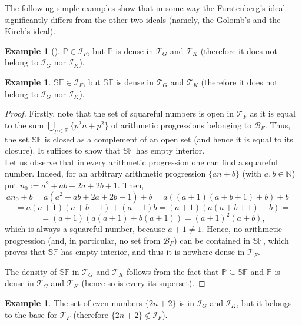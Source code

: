 \documentclass{amsart}
\theoremstyle{definition}
\theoremstyle{definition}
\newtheorem{ex}[thm]{Example}
\newcommand{\N}{{\mathbb N}}
\newcommand{\I}{\mathcal I}
\newcommand{\T}{\mathcal{T}}
\newcommand{\B}{\mathcal{B}}
\newcommand{\SqrFr}{\mathbb{SF}}
\begin{document}
The following simple examples show that in some way the Furstenberg's ideal significantly differs from the other two ideals (namely, the Golomb's and the Kirch's ideal).

\begin{ex}[{\cite[Section 5]{Szczuka4}}] \label{primes}
$\mathbb{P}\in \I_F$, but $\mathbb{P}$ is dense in $\T_G$ and $\T_K$ (therefore it does not belong to $\I_G$ nor $\I_K$).
\end{ex}

\begin{ex} 
$\SqrFr\in \I_F$, but $\SqrFr$ is dense in $\T_G$ and $\T_K$ (therefore it does not belong to $\I_G$ nor $\I_K$).
\end{ex}

\begin{proof}
Firstly, note that the set of squareful numbers is open in $\T_F$ as it is equal to the sum $\bigcup_{p\in\mathbb{P}}{\{p^2 n+p^2\}}$ of arithmetic progressions belonging to $\B_F$. Thus, the set $\SqrFr$ is closed as a complement of an open set (and hence it is equal to its closure). It suffices to show that $\SqrFr$ has empty interior.\\
Let us observe that in every arithmetic progression one can find a squareful number. Indeed, for an arbitrary arithmetic progression $\{an+b\}$ (with $a,b\in\N$) put $n_0 := a^2 +ab+2a+2b+1$. 
Then,
$$an_0 +b = a(a^2 +ab+2a+2b+1)+b = a((a+1)(a+b+1)+b)+b = $$
$$= a(a+1)(a+b+1)+(a+1)b = (a+1)(a(a+b+1)+b) =$$
$$= (a+1)(a(a+1)+b(a+1))= (a+1)^2 (a+b),$$
which is always a squareful number, because $a+1  \neq 1$. Hence, no arithmetic progression (and, in particular, no set from $\B_F$) can be contained in $\SqrFr$, which proves that $\SqrFr$ has empty interior, and thus it is nowhere dense in $\T_F$.

The density of $\SqrFr$ in $\T_G$ and $\T_K$ follows from the fact that $\mathbb{P}\subseteq \SqrFr$ and $\mathbb{P}$ is dense in $\T_G$ and $\T_K$ (hence so is every its superset).
\end{proof}

\begin{ex} \label{even}
The set of even numbers $\{2n+2\}$ is in $\I_G$ and $\I_K$, but it belongs to the base for $\T_F$ (therefore $\{2n+2\}\notin \I_F$).
\end{ex}
\end{document}
